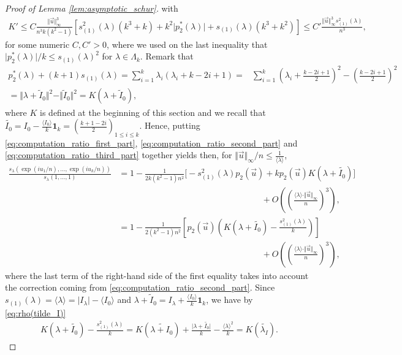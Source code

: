 \documentclass[10pt,11pt]{amsart}%
\begin{document}
\begin{proof}[Proof of Lemma \ref{lem:asymptotic_schur}]
with 
\begin{align*}
K'\leq C\frac{\Vert \vec{u}\Vert_{\infty}^3}{n^3k(k^2-1)}\left[s_{(1)}^2(\lambda)(k^3+k)+k^2\vert p^*_2(\lambda)\vert+s_{(1)}(\lambda)(k^3+k^2)\right]\leq C'\frac{\Vert \vec{u}\Vert_{\infty}^3s_{(1)}^2(\lambda)}{n^3},
\end{align*}
for some numeric $C,C'>0$, where we used on the last inequality that $\vert p_2^*(\lambda)\vert /k\leq s_{(1)}(\lambda)^2$ for $\lambda\in \Lambda_{k}$. Remark that 
\begin{align*}
p_2^*(\lambda)+(k+1)s_{(1)}(\lambda)=\sum_{i=1}^k\lambda_i(\lambda_i+k-2i+1)=&\sum_{i=1}^k\left(\lambda_i+\frac{k-2i+1}{2}\right)^2-\left(\frac{k-2i+1}{2}\right)^2\\
=\Vert \lambda+\tilde{I}_0\Vert^2-\Vert \tilde{I}_0\Vert^2=K(\lambda+\tilde{I}_0),
\end{align*}
where $K$ is defined at the beginning of this section and we recall that $\tilde{I_0}=I_0-\frac{\langle I_0\rangle}{k}\mathbf{1}_k=\left(\frac{k+1-2i}{2}\right)_{1\leq i\leq k}$. Hence, putting \eqref{eq:computation_ratio_first_part}, \eqref{eq:computation_ratio_second_part} and \eqref{eq:computation_ratio_third_part} together yields then, for $\Vert \vec{u}\Vert_\infty/n\leq \frac{1}{\langle \lambda\rangle}$,
\begin{align}
\frac{s_{\lambda}(\exp(iu_1/n),\ldots,\exp(iu_k/n))}{s_{\lambda}(1,\ldots,1)}&=1-\frac{1}{2k(k^2-1)n^2}\Big[-s_{(1)}^2(\lambda)p_2(\vec{u})+kp_2(\vec{u})K(\lambda+\tilde{I_0})\Big]\nonumber\\
&\hspace{7cm}+O\left(\left(\frac{\langle \lambda\rangle\cdot \Vert \vec{u}\Vert_\infty}{n}\right)^3\right),\nonumber\\
&=1-\frac{1}{2(k^2-1)n^2}\left[p_2(\vec{u})\left(K(\lambda+\tilde{I_0})-\frac{s_{(1)}^2(\lambda)}{k}\right)\right]\nonumber\\
&\hspace{7cm}+O\left(\left(\frac{\langle \lambda\rangle\cdot \Vert \vec{u}\Vert_\infty}{n}\right)^3\right),
\end{align}
where the last term of the right-hand side of the first equality takes into account the correction coming from \eqref{eq:computation_ratio_second_part}. Since $s_{(1)}(\lambda)=\langle \lambda\rangle=\vert I_{\lambda}\vert-\langle I_0\rangle$ and $\lambda+\tilde{I}_0=I_{\lambda}+\frac{\langle I_0\rangle}{k}\mathbf{1}_k$, we have by \eqref{eq:rho(tilde_I)}
\begin{align*}
K(\lambda+\tilde{I_0})-\frac{s_{(1)}^2(\lambda)}{k}=K(\widetilde{\lambda+I_0})+\frac{\vert \lambda+\tilde{I_0}\vert}{k}-\frac{\langle \lambda\rangle^2}{k}=K(\widetilde{\lambda_I}).

\end{align*}
\end{proof}
\end{document}
